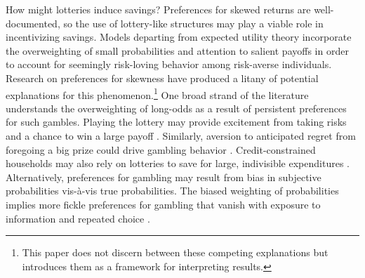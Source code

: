 \documentclass[11pt]{article}
\begin{document}

	How might lotteries induce savings? Preferences for skewed returns are well-documented, so the use of lottery-like structures may play a viable role in incentivizing savings. Models departing from expected utility theory incorporate the overweighting of small probabilities  and attention to salient payoffs  in order to account for seemingly risk-loving behavior among risk-averse individuals. Research on preferences for skewness have produced a litany of potential explanations for this phenomenon.\footnote{This paper does not discern between these competing explanations but introduces them as a framework for interpreting results.} One broad strand of the literature understands the overweighting of long-odds as a result of persistent preferences for such gambles. Playing the lottery may provide excitement from taking risks and a chance to win a large payoff . Similarly, aversion to anticipated regret from foregoing a big prize could drive gambling behavior . Credit-constrained households may also rely on lotteries to save for large, indivisible expenditures . Alternatively, preferences for gambling may result from bias in subjective probabilities vis-\`{a}-vis true probabilities. The biased weighting of probabilities implies more fickle preferences for gambling that vanish with exposure to information and repeated choice .

\end{document}

